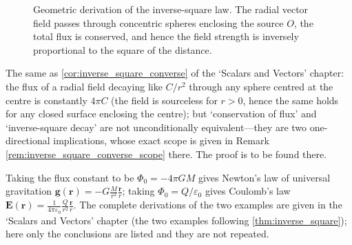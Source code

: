 \begin{figure}[htbp]
    \centering
    \caption{Geometric derivation of the inverse-square law. The radial vector field passes through concentric spheres enclosing the source $O$, the total flux is conserved, and hence the field strength is inversely proportional to the square of the distance.}
    \label{fig:inverse_square}
\end{figure}

\begin{remark}\label{cor:inverse_square_converse_vector}
The same as \cref{cor:inverse_square_converse} of the `Scalars and Vectors' chapter: the flux of a radial field decaying like $C/r^2$ through any sphere centred at the centre is constantly $4\pi C$ (the field is sourceless for $r>0$, hence the same holds for any closed surface enclosing the centre); but `conservation of flux' and `inverse-square decay' are not unconditionally equivalent---they are two one-directional implications, whose exact scope is given in Remark \ref{rem:inverse_square_converse_scope} there. The proof is to be found there.
\end{remark}

\begin{remark}
Taking the flux constant to be $\Phi_0 = -4\pi GM$ gives Newton's law of universal gravitation $\mathbf{g}(\mathbf{r}) = -G\frac{M}{r^2}\frac{\mathbf{r}}{r}$; taking $\Phi_0 = Q/\varepsilon_0$ gives Coulomb's law $\mathbf{E}(\mathbf{r}) = \frac{1}{4\pi\varepsilon_0}\frac{Q}{r^2}\frac{\mathbf{r}}{r}$. The complete derivations of the two examples are given in the `Scalars and Vectors' chapter (the two examples following \cref{thm:inverse_square}); here only the conclusions are listed and they are not repeated.
\end{remark}

